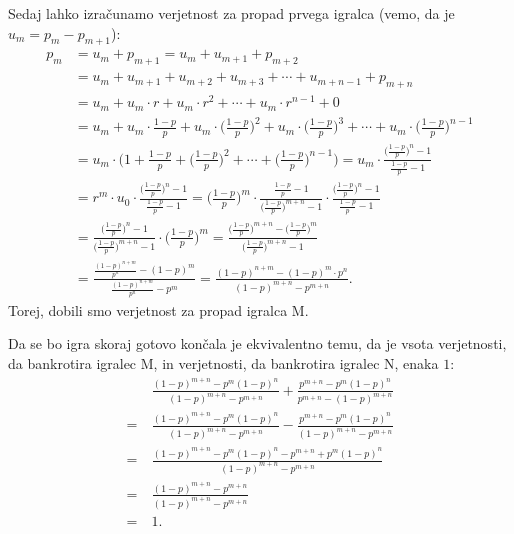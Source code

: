 \documentclass[12pt, a4paper]{article}
\begin{document}
Sedaj lahko izračunamo verjetnost za propad prvega igralca (vemo, da je $u_m = p_m - p_{m+1}$):
\begin{equation*}
\begin{split}
p_m &= u_m + p_{m+1} = u_m + u_{m+1} + p_{m+2}  \\
    &= u_m + u_{m+1} + u_{m+2} + u_{m+3} + \cdots + u_{m+n-1} + p_{m+n}  \\
    &= u_m + u_m \cdot r + u_m \cdot r^2 + \cdots + u_m \cdot r^{n-1} + 0  \\
    &= u_m + u_m \cdot \frac{1-p}{p} + u_m \cdot \Big( \frac{1-p}{p}\Big)^2 + u_m \cdot \Big(\frac{1-p}{p}\Big)^3 + \cdots + u_m \cdot \Big(\frac{1-p}{p}\Big)^{n-1}  \\
    &= u_m \cdot \bigg(1 + \frac{1-p}{p} + \Big(\frac{1-p}{p}\Big)^2 + \cdots + \Big(\frac{1-p}{p}\Big)^{n-1}\bigg) 
    = u_m \cdot \frac{\big(\frac{1-p}{p}\big)^n - 1}{\frac{1-p}{p} - 1}  \\
    &= r^m \cdot u_0 \cdot \frac{\big(\frac{1-p}{p}\big)^n - 1}{\frac{1-p}{p} - 1}  
    = \Big(\frac{1-p}{p}\Big)^m \cdot \frac{\frac{1-p}{p} - 1}{\big(\frac{1-p}{p}\big)^{m+n} -1}\cdot \frac{\big(\frac{1-p}{p}\big)^n - 1}{\frac{1-p}{p} - 1}  \\
    &= \frac{\big(\frac{1-p}{p}\big)^n - 1}{\big(\frac{1-p}{p}\big)^{m+n} -1} \cdot \Big(\frac{1-p}{p}\Big)^m 
    = \frac{\big(\frac{1-p}{p}\big)^{m+n} - \big(\frac{1-p}{p}\big)^m}{\big(\frac{1-p}{p}\big)^{m+n} -1} \\
    &= \frac{\frac{(1-p)^{n+m}}{p^n} - (1-p)^m}{\frac{(1-p)^{n+m}}{p^n} - p^m} = 
    \frac{(1-p)^{n+m} - (1-p)^m \cdot p^n}{(1-p)^{m+n} - p^{m+n}}.
\end{split} 
\end{equation*}
Torej, dobili smo verjetnost za propad igralca M.

Da se bo igra skoraj gotovo končala je ekvivalentno temu, da je vsota verjetnosti, da bankrotira igralec M, in verjetnosti,  da bankrotira igralec N, enaka $1$:
\begin{equation*}
\begin{split}
&~\frac{(1-p)^{m+n}-p^m (1-p)^n}{(1-p)^{m+n}-p^{m+n}}+\frac{p^{m+n}-p^m
   (1-p)^n}{p^{m+n}-(1-p)^{m+n}} \\
= &~\frac{(1-p)^{m+n}-p^m (1-p)^n}{(1-p)^{m+n}-p^{m+n}}-\frac{p^{m+n}-p^m
   (1-p)^n}{(1-p)^{m+n}-p^{m+n}} \\
= &~\frac{(1-p)^{m+n}-p^m (1-p)^n-p^{m+n}+p^m
   (1-p)^n}{(1-p)^{m+n}-p^{m+n}} \\
= &~\frac{(1-p)^{m+n}-p^{m+n}}{(1-p)^{m+n}-p^{m+n}} \\
= &~1.
\end{split} 
\end{equation*}
\end{document}

